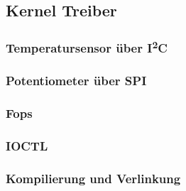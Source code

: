 \subsection{Kernel Treiber}
\subsubsection{Temperatursensor über I\textsuperscript{2}C}
\subsubsection{Potentiometer über SPI}
\subsubsection{Fops}
\subsubsection{IOCTL}
\subsubsection{Kompilierung und Verlinkung}
